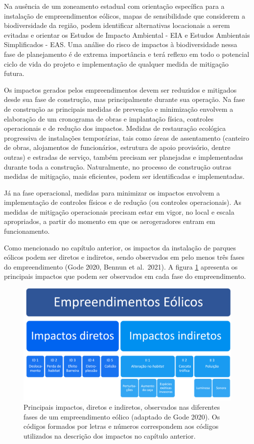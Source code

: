 \documentclass[
  oneside]{scrbook}
\begin{document}
Na ausência de um zoneamento estadual com orientação específica para a instalação de empreendimentos eólicos, mapas de sensibilidade que considerem a biodiversidade da região, podem identificar alternativas locacionais a serem evitadas e orientar os Estudos de Impacto Ambiental - EIA e Estudos Ambientais Simplificados - EAS. Uma análise do risco de impactos à biodiversidade nessa fase de planejamento é de extrema importância e terá reflexo em todo o potencial ciclo de vida do projeto e implementação de qualquer medida de mitigação futura.

Os impactos gerados pelos empreendimentos devem ser reduzidos e mitigados desde sua fase de construção, mas principalmente durante sua operação. Na fase de construção as principais medidas de prevenção e minimização envolvem a elaboração de um cronograma de obras e implantação física, controles operacionais e de redução dos impactos. Medidas de restauração ecológica progressiva de instalações temporárias, tais como áreas de assentamento (canteiro de obras, alojamentos de funcionários, estrutura de apoio provisório, dentre outras) e estradas de serviço, também precisam ser planejadas e implementadas durante toda a construção. Naturalmente, no processo de construção outras medidas de mitigação, mais eficientes, podem ser identificadas e implementadas.

Já na fase operacional, medidas para minimizar os impactos envolvem a implementação de controles físicos e de redução (ou controles operacionais). As medidas de mitigação operacionais precisam estar em vigor, no local e escala apropriados, a partir do momento em que os aerogeradores entram em funcionamento.

Como mencionado no capítulo anterior, os impactos da instalação de parques eólicos podem ser diretos e indiretos, sendo observados em pelo menos três fases do empreendimento (Gode 2020, Bennun et al.~2021). A figura \ref{fig:16} apresenta os principais impactos que podem ser observados em cada fase do empreendimento.

\begin{figure}

{\centering \includegraphics[width=0.75\linewidth]{imagens/cap05/Figura_5.1} 

}

\caption{Principais impactos, diretos e indiretos, observados nas diferentes fases de um empreendimento eólico (adaptado de Gode 2020). Os códigos formados por letras e números correspondem aos códigos utilizados na descrição dos  impactos  no capítulo anterior.}\label{fig:16}
\end{figure}
\end{document}
